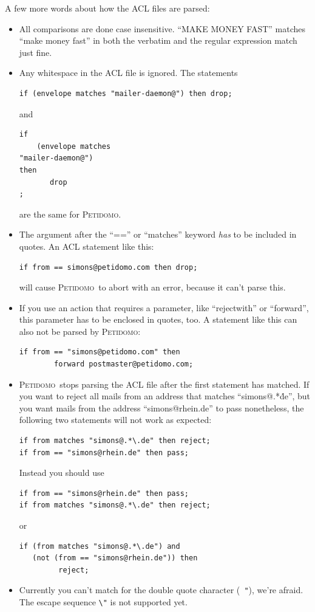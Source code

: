 \documentclass[a4paper,10pt]{scrreprt}
\newcommand{\Petidomo}{{\scshape Peti\-domo}}
\begin{document}
A few more words about how the ACL files are parsed:
\begin{itemize}

\item All comparisons are done case insensitive. ``MAKE MONEY FAST''
matches ``make money fast'' in both the verbatim and the regular
expression match just fine.

\item Any whitespace in the ACL file is ignored. The statements
\begin{verbatim}
if (envelope matches "mailer-daemon@") then drop;
\end{verbatim}
and
\begin{verbatim}
if
    (envelope matches
"mailer-daemon@")
then
       drop
;
\end{verbatim}
are the same for \Petidomo.

\item The argument after the ``=='' or ``matches'' keyword \emph{has}
to be included in quotes. An ACL statement like this:
\begin{verbatim}
if from == simons@petidomo.com then drop;
\end{verbatim}
will cause \Petidomo\ to abort with an error, because it can't parse
this.

\item If you use an action that requires a parameter, like
``rejectwith'' or ``forward'', this parameter has to be enclosed in
quotes, too. A statement like this can also not be parsed by
\Petidomo:
\begin{verbatim}
if from == "simons@petidomo.com" then
        forward postmaster@petidomo.com;
\end{verbatim}

\item \Petidomo\ stops parsing the ACL file after the first statement
has matched. If you want to reject all mails from an address that
matches ``simons@.*\.de'', but you want mails from the address
``simons@rhein.de'' to pass nonetheless, the following two statements
will not work as expected:
\begin{verbatim}
if from matches "simons@.*\.de" then reject;
if from == "simons@rhein.de" then pass;
\end{verbatim}

Instead you should use
\begin{verbatim}
if from == "simons@rhein.de" then pass;
if from matches "simons@.*\.de" then reject;
\end{verbatim}
or
\begin{verbatim}
if (from matches "simons@.*\.de") and
   (not (from == "simons@rhein.de")) then
         reject;
\end{verbatim}

\item Currently you can't match for the double quote character ({\tt
"}), we're afraid. The escape sequence {\tt \verb+\+"} is not
supported yet.

\end{itemize}
\end{document}
